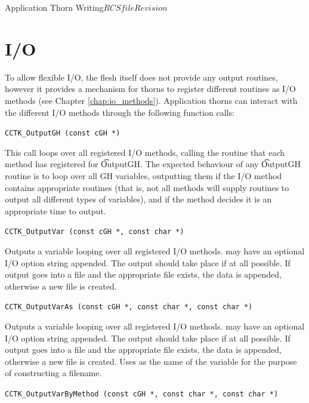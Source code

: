 \begin{cactuspart}{Application Thorn Writing}{$RCSfile$}{$Revision$}

\section{I/O}
\label{sec:io}

To allow flexible I/O, the flesh itself does not provide any output
routines, however it provides a mechanism for thorns to register
different routines as I/O methods (see Chapter \ref{chap:io_methods}).
Application thorns can interact with the different I/O methods through
the following function calls:

\begin{description}

\item \texttt{CCTK\_OutputGH (const cGH *)}

This call loops over all registered I/O methods, calling the routine
that each method has registered for {\t OutputGH}.  The expected
behaviour of any {\t OutputGH} routine is to loop over all GH
variables, outputting them if the I/O method contains appropriate
routines (that is, not all methods will supply routines to output all
different types of variables), and if the method decides it is an
appropriate time to output.

\item \texttt{CCTK\_OutputVar (const cGH *, const char *)}

Outputs a variable  looping over all registered I/O methods.
 may have an optional I/O option string appended.
The output should take place if at all possible.  If output goes into
a file and the appropriate file exists, the data is appended, otherwise
a new file is created.

\item \texttt{CCTK\_OutputVarAs (const cGH *, const char *, const char *)}

Outputs a variable  looping over all registered I/O methods.
 may have an optional I/O option string appended.
The output should take place if at all possible.  If output goes into
a file and the appropriate file exists, the data is appended, otherwise
a new file is created.  Uses  as the name of the variable
for the purpose of constructing a filename.

\item \texttt{CCTK\_OutputVarByMethod (const cGH *, const char *, const char *)}


\end{description}
\end{cactuspart}
